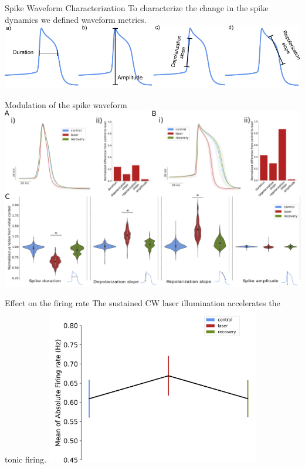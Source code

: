 \documentclass[aspectratio=43]{beamer}
\begin{document}
\begin{frame}{Spike Waveform Characterization}
	\centering
	To characterize the change in the spike dynamics we defined waveform metrics. \\
	\vspace{15pt}
	\includegraphics[width=\textwidth]{laser/spike_metrics.pdf}
\end{frame}

\begin{frame}{Modulation of the spike waveform}
	\includegraphics[width=\textwidth]{laser/Figure2.png}
\end{frame}

\begin{frame}{Effect on the firing rate}
	\centering
	The sustained CW laser illumination accelerates the tonic firing.
	\includegraphics[width=0.7\textwidth]{Images/frequency-general.pdf}
\end{frame}
\end{document}
